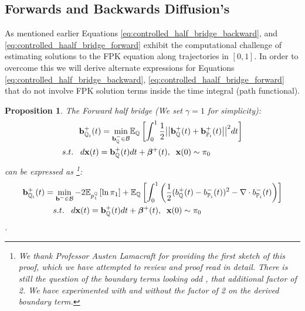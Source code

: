 \documentclass[a4paper,12pt,twoside,openright]{report}
\newtheorem{proposition}[theorem]{Proposition}
\theoremstyle{definition}
\begin{document}
\subsection{Forwards and Backwards Diffusion's}

As mentioned earlier Equations \ref{eq:controlled_half_bridge_backward}, and \ref{eq:controlled_haalf_bridge_forward} exhibit the computational challenge of estimating solutions to the FPK equation along trajectories in $[0,1]$.  In order to overcome this we will derive alternate expressions for Equations \ref{eq:controlled_half_bridge_backward},  \ref{eq:controlled_haalf_bridge_forward} that do not involve FPK solution terms inside the time integral (path functional).
\begin{proposition}\label{prop:halfforcontrol}
The Forward half bridge (We set $\gamma=1$  for simplicity):
\begin{align*} 
   {\mathbf{b}}^{+}_{{\mathbb{Q}}_{i}}(t) =\min_{{\mathbf{b}}_{\mathbb{Q}}^{-} \in {\mathcal{B}} } & \mathbb{E}_{\mathbb{Q}}\left[\int_0^1 \frac{1}{2}\big|\big|{\mathbf{b}}_{\mathbb{Q}}^{+}(t) +{\mathbf{b}}^{+}_{{\mathbb{P}}_{i}}(t)\big|\big|^2 dt\right] \nonumber \\
    s.t.\;\;\; d{\mathbf{x}}(t) = {\mathbf{b}}_{\mathbb{Q}}^{+}(t) &dt +  {\bm{\beta}}^{+}(t), \;\; {\mathbf{x}}(0) \sim \pi_0
\end{align*}
can be expressed as \footnote{We thank Professor Austen Lamacraft for providing the first sketch of this proof, which we have attempted to review and proof read in detail. There is still the question of the boundary terms looking odd , that additional factor of 2. We have experimented with and without the factor of 2 on the derived boundary term.}:
\begin{align} \label{eq:div_control_forward}
   {\mathbf{b}}^{+}_{{\mathbb{Q}}_{i}}(t) =\min_{{\mathbf{b}}^{-} \in {\mathcal{B}} } -2\mathbb{E}_{p^{{\mathbb{Q}}}_1}\left[\operatorname{ln} \pi_1 \right] &+ \mathbb{E}_{{\mathbb{Q}}}\left[\int_0^1 \left(\frac{1}{2}(b_{\mathbb{Q}}^{+}(t) - b_{{\mathbb{P}}_{i}}^{-}(t))^2 - \nabla\cdot b^{-}_{{\mathbb{P}}_{i}}(t) \right)\right] \nonumber \\
    s.t.\;\;\; d{\mathbf{x}}(t) = {\mathbf{b}}_{\mathbb{Q}}^{+}(t) &dt + {\bm{\beta}}^{+}(t), \;\; {\mathbf{x}}(0) \sim \pi_0
\end{align}.
\end{proposition}
\end{document}

